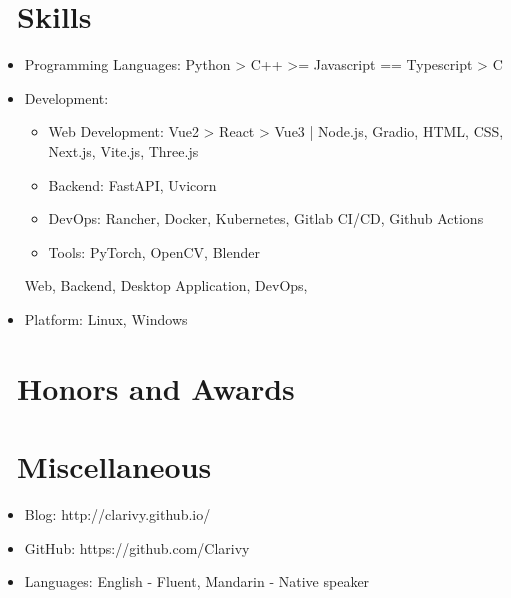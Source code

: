 \documentclass{resume}
\begin{document}
\section{\faCogs\ Skills}
\begin{itemize}[parsep=0.5ex]
  \item Programming Languages: Python > C++ >= Javascript == Typescript > C
  \item Development:
        \begin{itemize}
          \item Web Development: Vue2 > React > Vue3 | Node.js, Gradio, HTML, CSS, Next.js, Vite.js, Three.js
          \item Backend: FastAPI, Uvicorn
          \item DevOps: Rancher, Docker, Kubernetes, Gitlab CI/CD, Github Actions
          \item Tools: PyTorch, OpenCV, Blender
        \end{itemize}
        Web, Backend, Desktop Application, DevOps,
  \item Platform: Linux, Windows
\end{itemize}

\section{\faHeartO\ Honors and Awards}

\section{\faInfo\ Miscellaneous}
\begin{itemize}[parsep=0.5ex]
  \item Blog: http://clarivy.github.io/
  \item GitHub: https://github.com/Clarivy
  \item Languages: English - Fluent, Mandarin - Native speaker
\end{itemize}

%
%
\end{document}
